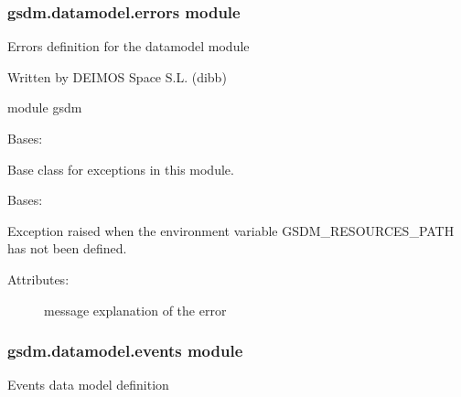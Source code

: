 \subsubsection{gsdm.datamodel.errors module}
\label{\detokenize{gsdm.datamodel:module-gsdm.datamodel.errors}}\label{\detokenize{gsdm.datamodel:gsdm-datamodel-errors-module}}
Errors definition for the datamodel module

Written by DEIMOS Space S.L. (dibb)

module gsdm

\begin{fulllineitems}
\label{\detokenize{gsdm.datamodel:gsdm.datamodel.errors.Error}}
Bases: 

Base class for exceptions in this module.

\end{fulllineitems}


\begin{fulllineitems}
\label{\detokenize{gsdm.datamodel:gsdm.datamodel.errors.GsdmResourcesPathNotAvailable}}
Bases: {\hyperref[\detokenize{gsdm.datamodel:gsdm.datamodel.errors.Error}]{}}

Exception raised when the environment variable GSDM\_RESOURCES\_PATH has not been defined.
\begin{description}
\item[{Attributes:}] \leavevmode
message \textendash{} explanation of the error

\end{description}

\end{fulllineitems}



\subsubsection{gsdm.datamodel.events module}
\label{\detokenize{gsdm.datamodel:module-gsdm.datamodel.events}}\label{\detokenize{gsdm.datamodel:gsdm-datamodel-events-module}}
Events data model definition

